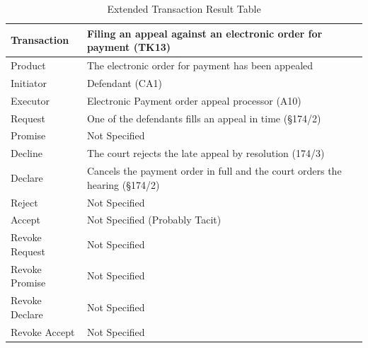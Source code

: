 \begin{landscape}
\begin{table}[h]
\caption{Extended Transaction Result Table}
\label{tab:etrt}
\begin{tabular}{|l||l|l|}
\hline
Transaction  &  Filing an appeal against an electronic order for payment (TK13) \\ \hline
Product      &  The electronic order for payment has been appealed \\ \hline
Initiator      &  Defendant (CA1) \\ \hline
Executor       & Electronic Payment order appeal processor (A10) \\ \hline
Request        & One of the defendants fills an appeal in time (\S174/2)
  \\ \hline
Promise        &    Not Specified   \\ \hline
Decline        & The court rejects the late appeal by resolution (174/3)  \\ \hline
Declare        &  Cancels the payment order in full and the court orders the hearing (\S174/2)  \\ \hline
Reject         &  Not Specified   \\ \hline
Accept         & Not Specified (Probably Tacit) \\ \hline
Revoke Request & Not Specified \\ \hline
Revoke Promise & Not Specified  \\ \hline
Revoke Declare & Not Specified      \\ \hline
Revoke Accept  &  Not Specified \\ \hline
\end{tabular}
\end{table}


\end{landscape}
